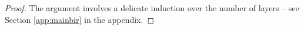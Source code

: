 \documentclass[twoside]{article}
\theoremstyle{plain}%
\theoremstyle{definition}
\theoremstyle{remark}
\begin{document}
\begin{proof}

The argument involves a delicate induction over the number of layers -- see Section \ref{app:mainbir} in the appendix. 
\end{proof}
\end{document}
